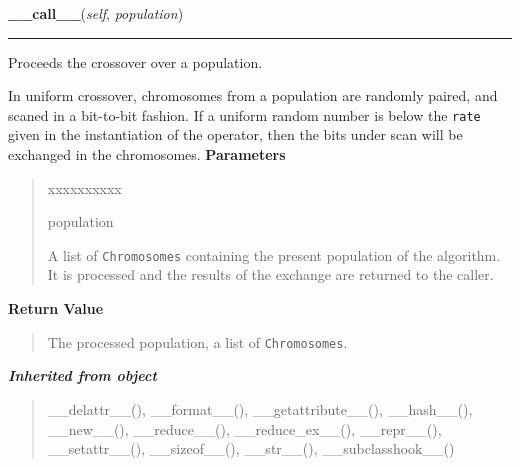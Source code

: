 \hspace{.8\funcindent}\begin{boxedminipage}{\funcwidth}

    \raggedright \textbf{\_\_call\_\_}(\textit{self}, \textit{population})

    \vspace{-1.5ex}

    \rule{\textwidth}{0.5\fboxrule}
\setlength{\parskip}{2ex}

Proceeds the crossover over a population.

In uniform crossover, chromosomes from a population are randomly paired,
and scaned in a bit-to-bit fashion. If a uniform random number is below
the \texttt{rate} given in the instantiation of the operator, then the bits
under scan will be exchanged in the chromosomes.
\setlength{\parskip}{1ex}
      \textbf{Parameters}
      \vspace{-1ex}

      \begin{quote}
        \begin{Ventry}{xxxxxxxxxx}

          \item[population]


A list of \texttt{Chromosomes} containing the present population of the
algorithm. It is processed and the results of the exchange are
returned to the caller.
        \end{Ventry}

      \end{quote}

      \textbf{Return Value}
    \vspace{-1ex}

      \begin{quote}

The processed population, a list of \texttt{Chromosomes}.
      \end{quote}

    \end{boxedminipage}


\large{\textbf{\textit{Inherited from object}}}

\begin{quote}
\_\_delattr\_\_(), \_\_format\_\_(), \_\_getattribute\_\_(), \_\_hash\_\_(), \_\_new\_\_(), \_\_reduce\_\_(), \_\_reduce\_ex\_\_(), \_\_repr\_\_(), \_\_setattr\_\_(), \_\_sizeof\_\_(), \_\_str\_\_(), \_\_subclasshook\_\_()
\end{quote}


